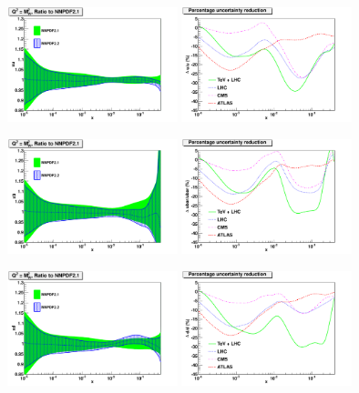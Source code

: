 \begin{figure}[hp!]
  \centering
  \includegraphics[width=0.44\textwidth]{6-LHCimpact/figs/xu-nnpdf22.pdf}
    \includegraphics[width=0.44\textwidth]{6-LHCimpact/figs/u-perc.pdf}

  \includegraphics[width=0.44\textwidth]{6-LHCimpact/figs/xubar-nnpdf22.pdf}
    \includegraphics[width=0.44\textwidth]{6-LHCimpact/figs/ubar-perc.pdf}

  \includegraphics[width=0.44\textwidth]{6-LHCimpact/figs/xd-nnpdf22.pdf}
    \includegraphics[width=0.44\textwidth]{6-LHCimpact/figs/d-perc.pdf}


\end{figure}
